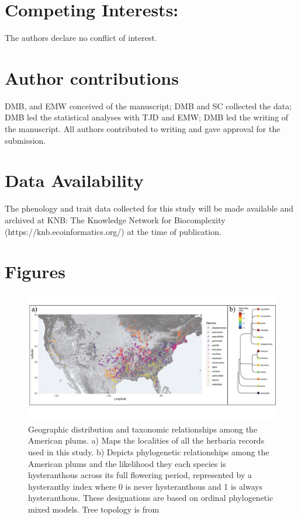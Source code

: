 \documentclass{article}[12pt]
\begin{document}
{\section*{Competing Interests:}
The authors declare no conflict of interest.

\section*{Author contributions}
DMB, and EMW conceived of the manuscript; DMB and SC collected the data; DMB led the statistical analyses with TJD and EMW; DMB led the writing of the manuscript. All authors contributed to writing and gave approval for the submission.

\section*{Data Availability}
The phenology and trait data collected for this study will be made available and archived at KNB: The Knowledge Network for Biocomplexity (https://knb.ecoinformatics.org/) at the time of publication.

 

\newpage
\section*{Figures}


\begin{figure}[h!]
  \centering
 \includegraphics[width=\textwidth]{..//..//Plots/fig_1.png}
    \caption{Geographic distribution and taxonomic relationships among the American plums. a) Maps the localities of all the herbaria records used in this study. b) Depicts phylogenetic relationships among the American plums and the likelihood they each species is hysteranthous across its full flowering period, represented by a hysteranthy index where 0 is never hysteranthous and 1 is always hysteranthous. These designations are based on ordinal phylogenetic mixed models. Tree topology is from \citet{Shaw:2004aa}}
    \label{fig:phylo2}
\end{figure}



}
\end{document}

